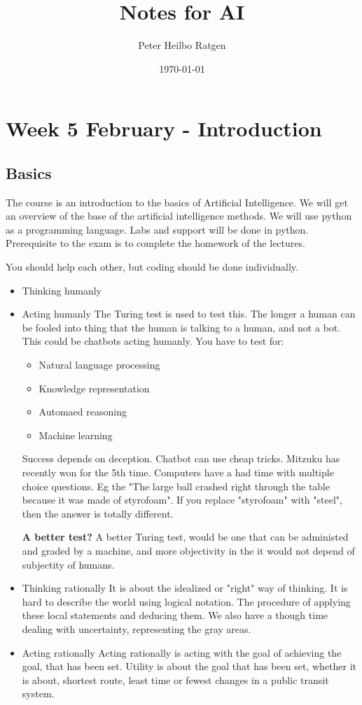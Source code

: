 \documentclass{article}
\title{Notes for AI}
\author{Peter Heilbo Ratgen}
\date{\today}
\begin{document}
\maketitle

\tableofcontents

\newpage

\section{Week 5 February - Introduction}%
\subsection{Basics}
The course is an introduction to the basics of Artificial Intelligence. We will
get an overview of the base of the artificial intelligence methods. We will use
python as a programming language. Labs and support will be done in python.
Prerequisite to the exam is to complete the homework of the lectures.
\cite{book:artificial_intelligence_modern_approach}

You should help each other, but coding should be done individually.
\begin{itemize}
  \item Thinking humanly
  \item Acting humanly
  \subitem The Turing test is used to test this. The longer a human can be
  fooled into thing that the human is talking to a human, and not a bot.  This
  could be chatbots acting humanly. You have to test for:
  \begin{itemize}
    \item Natural language processing
    \item Knowledge representation
    \item Automaed reasoning\
    \item Machine learning
  \end{itemize}
    Success depends on deception. Chatbot can use cheap tricks. Mitzuku has
    recently won for the 5th time.
    Computers have a had time with multiple choice questions. Eg the "The large
    ball crashed right through the table because it was made of styrofoam". If
    you replace "styrofoam" with "steel", then the answer is totally different.
    
    \textbf{A better test?} A better Turing test, would be one that can be
    administed and graded by a machine, and more objectivity in the it would not
    depend of subjectity of humans.

  \item Thinking rationally
    \subitem
    It is about the idealized or "right" way of thinking. It is hard to describe
    the world using logical notation. The procedure of applying these local
    statements and deducing them. 
    We also have a though time dealing with uncertainty, representing the gray
    areas.
  \item Acting rationally
    \subitem
    Acting rationally is acting with the goal of achieving the goal, that has
    been set. Utility is about the goal that has been set, whether it is about,
    shortest route, least time or fewest changes in a public transit system.
\end{itemize}
\end{document}
